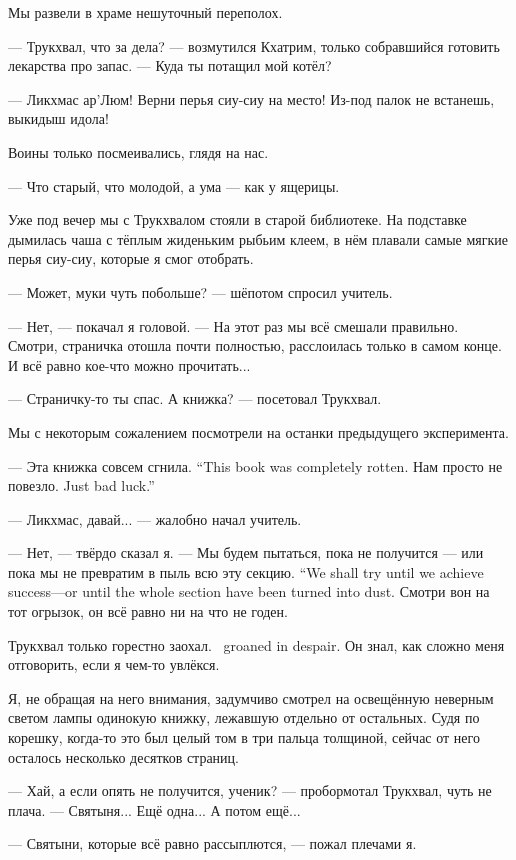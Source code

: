 Мы развели в храме нешуточный переполох.

--- Трукхвал, что за дела? --- возмутился Кхатрим, только собравшийся готовить лекарства про запас.
--- Куда ты потащил мой котёл?

--- Ликхмас ар’Люм!
Верни перья сиу-сиу на место!
Из-под палок не встанешь, выкидыш идола!

Воины только посмеивались, глядя на нас.

--- Что старый, что молодой, а ума --- как у ящерицы.

Уже под вечер мы с Трукхвалом стояли в старой библиотеке.
На подставке дымилась чаша с тёплым жиденьким рыбьим клеем, в нём плавали самые мягкие перья сиу-сиу, которые я смог отобрать.

--- Может, муки чуть побольше? --- шёпотом спросил учитель.

--- Нет, --- покачал я головой.
--- На этот раз мы всё смешали правильно.
Смотри, страничка отошла почти полностью, расслоилась только в самом конце.
И всё равно кое-что можно прочитать...

--- Страничку-то ты спас.
А книжка? --- посетовал Трукхвал.

Мы с некоторым сожалением посмотрели на останки предыдущего эксперимента.

{--- Эта книжка совсем сгнила.}
{``This book was completely rotten.}
{Нам просто не повезло.}
{Just bad luck.''}

--- Ликхмас, давай... --- жалобно начал учитель.

--- Нет, --- твёрдо сказал я.
{--- Мы будем пытаться, пока не получится --- или пока мы не превратим в пыль всю эту секцию.}
{``We shall try until we achieve success---or until the whole section have been turned into dust.}
Смотри вон на тот огрызок, он всё равно ни на что не годен.

{Трукхвал только горестно заохал.}
{\Trukchual\ groaned in despair.}
Он знал, как сложно меня отговорить, если я чем-то увлёкся.

Я, не обращая на него внимания, задумчиво смотрел на освещённую неверным светом лампы одинокую книжку, лежавшую отдельно от остальных.
Судя по корешку, когда-то это был целый том в три пальца толщиной, сейчас от него осталось несколько десятков страниц.

--- Хай, а если опять не получится, ученик? --- пробормотал Трукхвал, чуть не плача.
--- Святыня...
Ещё одна...
А потом ещё...

--- Святыни, которые всё равно рассыплются, --- пожал плечами я.

